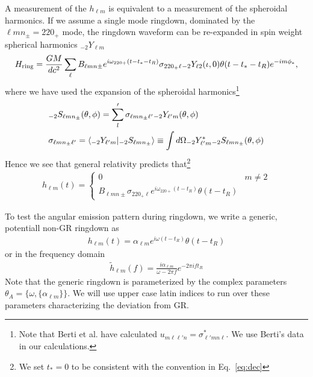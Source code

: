 \documentclass[aps,prd,amsmath,showpacs,amssymb,superscriptaddress,nofootinbib,longbibliography,eqsecnum,preprintnumbers]{revtex4-1}
\newcommand{\Sph}{{}_{-2}S_{\ell m n_{\pm}}}
\newcommand{\Ys}{{}_{-2}Y_{\ell m}}
\newcommand{\mul}{{\ell m n_{\pm}}}
\begin{document}
A measurement of the $h_{\ell m}$ is equivalent to a measurement of the spheroidal harmonics.
If we assume a single mode ringdown, dominated by the $\mul=220_+$ mode, the ringdown waveform can be re-expanded in spin weight spherical harmonics $\Ys$
\begin{align}
H_{\rm ring}=\frac{GM}{dc^2}\sum_{\ell}B_{\ell m n \pm}e^{i\omega_{220+}(t-t_*-t_R)}\sigma_{220_+\ell }{}_{-2}Y_{\ell 2}(\iota,0) \theta(t-t_*-t_R)e^{-im\phi_*},
\end{align}
where we have used the expansion of the spheroidal harmonics\footnote{Note that Berti et al. \cite{Berti:2014fga} have calculated $u_{m\ell \ell'n}=\sigma_{\ell'mn\ell}^*$. We use Berti's data in our calculations.}
\begin{align}
&\Sph(\theta, \phi)=\sum_l'\sigma_{\ell m n_{\pm} \ell'}{}_{-2}Y_{\ell'm}(\theta,\phi) \nonumber \\
&\sigma_{\ell m n_\pm \ell'}=\braket{{}_{-2}Y_{\ell' m}|\Sph}\equiv \int d\Omega {}_{-2}Y^*_{\ell ' m}\Sph(\theta,\phi)
\end{align}
Hence we see that general relativity predicts that\footnote{We set $t_*=0$ to be consistent with the convention in Eq.~\eqref{eq:dec}} 
\begin{align}
h_{\ell m}(t)=
\begin{cases}
0 & m\neq 2 \\
B_{\ell m n\pm}\sigma_{220_+\ell }e^{i\omega_{220+}(t-t_R)}\theta(t-t_R)
\end{cases}
\end{align}

To test the angular emission pattern during ringdown, we write a generic, potentiall non-GR ringdown as
\begin{align}
h_{\ell m}(t)=\alpha_{\ell m}e^{i\omega (t-t_R)} \theta(t-t_R) \label{eq:genr}
\end{align}
or in the frequency domain
\begin{align}
\tilde h_{\ell m}(f)=\frac{i\alpha_{\ell m}}{\omega -2\pi f}e^{-2\pi i ft_R}
\end{align}
Note that the generic ringdown is parameterized by the complex parameters ${\theta_A}=\{\omega,\{\alpha_{\ell m}\}\}$. We will use upper case latin indices to run over these parameters characterizing the deviation from GR.
\end{document}
